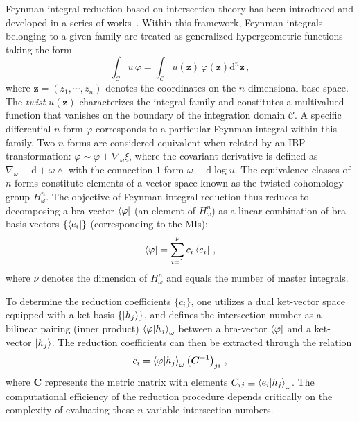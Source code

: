 \documentclass[reprint,superscriptaddress]{revtex4-2}
\newcommand{\w}{\omega}
\newcommand{\dif}{\mathrm{d}}
\begin{document}
Feynman integral reduction based on intersection theory has been introduced and developed in a series of works~\cite{Mizera:2017rqa, Mastrolia:2018uzb, Frellesvig:2019kgj, Frellesvig:2019uqt, Mizera:2019vvs, Mizera:2020wdt, Frellesvig:2020qot, Caron-Huot:2021xqj, Caron-Huot:2021iev, Chestnov:2022alh, Fontana:2023amt, Brunello:2023rpq, Brunello:2024tqf}. Within this framework, Feynman integrals belonging to a given family are treated as generalized hypergeometric functions taking the form
\begin{equation}
    \int_{\mathcal{C}} u \, \varphi = \int_{\mathcal{C}} u(\bm{z}) \, \hat{\varphi}(\bm{z}) \dif^n \bm{z} \,,
\end{equation}
where $\bm{z}=(z_1,\cdots,z_n)$ denotes the coordinates on the $n$-dimensional base space. The \textit{twist} $u(\bm{z})$ characterizes the integral family and constitutes a multivalued function that vanishes on the boundary of the integration domain $\mathcal{C}$. A specific differential $n$-form $\varphi$ corresponds to a particular Feynman integral within this family. Two $n$-forms are considered equivalent when related by an IBP transformation: $\varphi \sim \varphi + \nabla_\w \xi$, where the covariant derivative is defined as $\nabla_\w \equiv \dif + \omega \wedge$ with the connection $1$-form $\w \equiv \dif \log u$. The equivalence classes of $n$-forms constitute elements of a vector space known as the twisted cohomology group $H_\w^n$. The objective of Feynman integral reduction thus reduces to decomposing a bra-vector $\bra{\varphi}$ (an element of $H_\w^n$) as a linear combination of bra-basis vectors $\{\bra{e_i}\}$ (corresponding to the MIs):
\begin{equation}
    \bra{\varphi} = \sum_{i=1}^{\nu} c_i \bra{e_i} \,,
\end{equation}
where $\nu$ denotes the dimension of $H_\w^n$ and equals the number of master integrals.

To determine the reduction coefficients $\{c_i\}$, one utilizes a dual ket-vector space equipped with a ket-basis $\{\ket{h_j}\}$, and defines the intersection number as a bilinear pairing (inner product) $\braket{\varphi | h_j}_\w$ between a bra-vector $\bra{\varphi}$ and a ket-vector $\ket{h_j}$. The reduction coefficients can then be extracted through the relation
\begin{equation}
    c_i = \braket{\varphi | h_j}_\w \left( \bm{C}^{-1} \right)_{ji} \,,
    \label{eq:reduction_coefficient}
\end{equation}
where $\bm{C}$ represents the metric matrix with elements $C_{ij} \equiv \braket{e_i | h_j}_\w$. The computational efficiency of the reduction procedure depends critically on the complexity of evaluating these $n$-variable intersection numbers.
\end{document}

